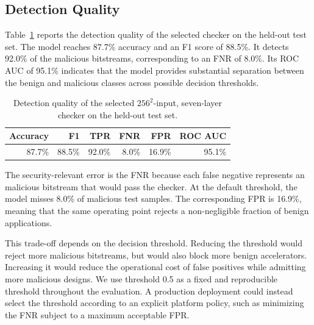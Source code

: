 \documentclass[acmsmall]{acmart}
\begin{document}
\subsection{Detection Quality}
\label{sec:eval-detection}

Table~\ref{tab:detection-results} reports the detection quality of the selected
checker on the held-out test set. The model reaches 87.7\% accuracy and an F1
score of 88.5\%. It detects 92.0\% of the malicious bitstreams, corresponding to
an FNR of 8.0\%. Its ROC AUC of 95.1\% indicates that the model provides
substantial separation between the benign and malicious classes across possible
decision thresholds.

\begin{table}[tbp]
    \centering
    \caption{Detection quality of the selected $256^2$-input, seven-layer
    checker on the held-out test set.}
    \label{tab:detection-results}
    \small
    \begin{tabular}{@{}rrrrrr@{}}
        \toprule
        Accuracy & F1 & TPR & FNR & FPR & ROC AUC \\
        \midrule
        87.7\% & 88.5\% & 92.0\% & 8.0\% & 16.9\% & 95.1\% \\
        \bottomrule
    \end{tabular}
\end{table}

The security-relevant error is the FNR because each false negative represents an
malicious bitstream that would pass the checker. At the default threshold,
the model misses 8.0\% of malicious test samples. The corresponding FPR is
16.9\%, meaning that the same operating point rejects a non-negligible fraction
of benign applications.

This trade-off depends on the decision threshold. Reducing the threshold would
reject more malicious bitstreams, but would also block more benign
accelerators. Increasing it would reduce the operational cost of false positives
while admitting more malicious designs. We use threshold 0.5 as a fixed and
reproducible threshold throughout the evaluation. A production deployment
could instead select the threshold according to an explicit platform policy, such
as minimizing the FNR subject to a maximum acceptable FPR.

%
\end{document}
